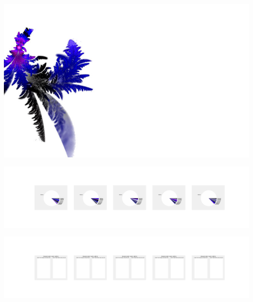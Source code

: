 \documentclass[11pt]{article}
\begin{document}
\begin{landscape}
    \begin{center}
    \includegraphics[width=\textwidth]{./nbimg/file (37).jpg}
    \end{center}

    \begin{center}
    \includegraphics[width=250mm]{./nbimg/pie-300.jpg}
    \end{center}

    \begin{center}
    \includegraphics[width=250mm]{./nbimg/peak-300.jpg}
    \end{center}
    


\end{landscape}
\end{document}
